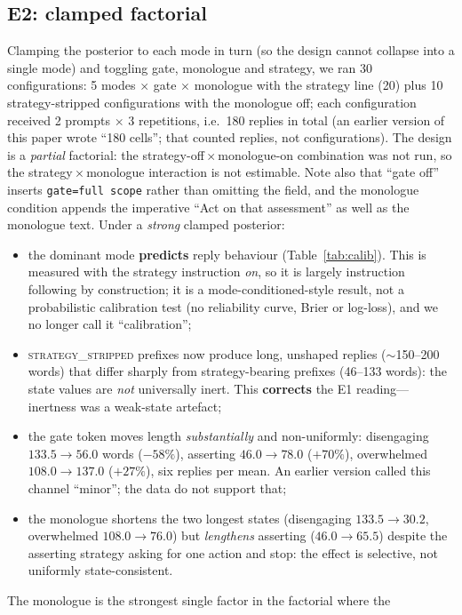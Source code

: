 \documentclass[11pt]{article}
\begin{document}
\subsection{E2: clamped factorial}
Clamping the posterior to each mode in turn (so the design cannot collapse into a
single mode) and toggling gate, monologue and strategy, we ran 30
configurations: 5 modes $\times$ gate $\times$ monologue with the strategy line
(20) plus 10 strategy-stripped configurations with the monologue off; each
configuration received 2 prompts $\times$ 3 repetitions, i.e.\ 180 replies in
total (an earlier version of this paper wrote ``180 cells''; that counted
replies, not configurations). The design is a \emph{partial} factorial: the
strategy-off\,$\times$\,monologue-on combination was not run, so the
strategy\,$\times$\,monologue interaction is not estimable. Note also that
``gate off'' inserts \texttt{gate=full scope} rather than omitting the field,
and the monologue condition appends the imperative ``Act on that assessment''
as well as the monologue text. Under a \emph{strong} clamped posterior:
\begin{itemize}
\item the dominant mode \textbf{predicts} reply behaviour (Table~\ref{tab:calib}).
This is measured with the strategy instruction \emph{on}, so it is largely
instruction following by construction; it is a mode-conditioned-style result,
not a probabilistic calibration test (no reliability curve, Brier or log-loss),
and we no longer call it ``calibration'';
\item \textsc{strategy\_stripped} prefixes now produce long, unshaped replies
($\sim$150--200 words) that differ sharply from strategy-bearing prefixes
(46--133 words): the state values are \emph{not} universally inert. This
\textbf{corrects} the E1 reading---inertness was a weak-state artefact;
\item the gate token moves length \emph{substantially} and non-uniformly:
disengaging $133.5\to56.0$ words ($-58\%$), asserting $46.0\to78.0$ ($+70\%$),
overwhelmed $108.0\to137.0$ ($+27\%$), six replies per mean. An earlier version
called this channel ``minor''; the data do not support that;
\item the monologue shortens the two longest states (disengaging
$133.5\to30.2$, overwhelmed $108.0\to76.0$) but \emph{lengthens} asserting
($46.0\to65.5$) despite the asserting strategy asking for one action and stop:
the effect is selective, not uniformly state-consistent.
\end{itemize}
The monologue is the strongest single factor in the factorial where the
\end{document}
